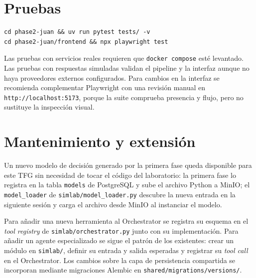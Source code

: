 \section{Pruebas}

\begin{verbatim}
cd phase2-juan && uv run pytest tests/ -v
cd phase2-juan/frontend && npx playwright test
\end{verbatim}

Las pruebas con servicios reales requieren que \texttt{docker compose} esté
levantado. Las pruebas con respuestas simuladas validan el
pipeline y la interfaz aunque no haya proveedores externos configurados. Para
cambios en la interfaz se recomienda complementar Playwright con una revisión
manual en \texttt{http://localhost:5173}, porque la suite comprueba presencia y
flujo, pero no sustituye la inspección visual.

\section{Mantenimiento y extensión}

Un nuevo modelo de decisión generado por la primera fase queda disponible para
este TFG sin necesidad de tocar el código del laboratorio: la primera fase lo
registra en la tabla \texttt{models} de PostgreSQL y sube el archivo Python a
MinIO; el \texttt{model\_loader} de \texttt{simlab/model\_loader.py} descubre la
nueva entrada en la siguiente sesión y carga el archivo desde MinIO al
instanciar el modelo.

Para añadir una nueva herramienta al Orchestrator se registra su esquema en el
\textit{tool registry} de \texttt{simlab/orchestrator.py} junto con su
implementación. Para añadir un agente especializado se sigue el patrón de los
existentes: crear un módulo en \texttt{simlab/}, definir su entrada y salida
esperadas y registrar su \textit{tool call} en el Orchestrator. Los cambios
sobre la capa de persistencia compartida se incorporan mediante migraciones
Alembic en \texttt{shared/migrations/versions/}.
